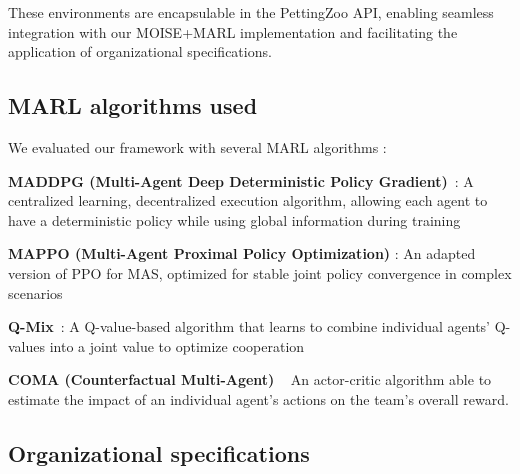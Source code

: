 \documentclass[sigconf]{aamas}
\begin{document}
These environments are encapsulable in the PettingZoo API, enabling seamless integration with our MOISE+MARL implementation and facilitating the application of organizational specifications.

\subsection{MARL algorithms used}

We evaluated our framework with several MARL algorithms :
%
\begin{enumerate*}[label={\roman*) },itemjoin={; \quad}]

  \item \textbf{MADDPG (Multi-Agent Deep Deterministic Policy Gradient)}~\cite{lowe2017multi}: A centralized learning, decentralized execution algorithm, allowing each agent to have a deterministic policy while using global information during training

  \item \textbf{MAPPO (Multi-Agent Proximal Policy Optimization)} \cite{yu2021mappo}: An adapted version of PPO for MAS, optimized for stable joint policy convergence in complex scenarios

  \item \textbf{Q-Mix}~\cite{rashid2018qmix}: A Q-value-based algorithm that learns to combine individual agents' Q-values into a joint value to optimize cooperation

  \item \textbf{COMA (Counterfactual Multi-Agent) }~\cite{foerster2018counterfactual} An actor-critic algorithm able to estimate the impact of an individual agent's actions on the team's overall reward.
\end{enumerate*}

\subsection{Organizational specifications}
\end{document}
